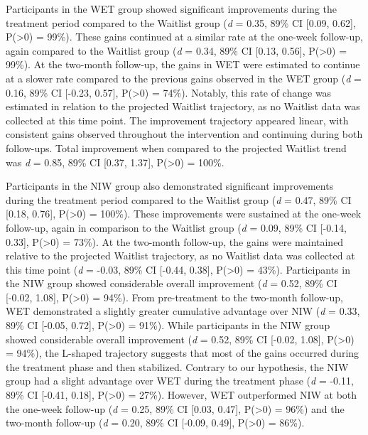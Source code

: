 \documentclass[
  man,floatsintext]{apa7}
\begin{document}
Participants in the WET group showed significant improvements during the treatment period compared to the Waitlist group (\emph{d} = 0.35, 89\% CI {[}0.09, 0.62{]}, P(\textgreater0) = 99\%).
These gains continued at a similar rate at the one-week follow-up, again compared to the Waitlist group (\emph{d} = 0.34, 89\% CI {[}0.13, 0.56{]}, P(\textgreater0) = 99\%).
At the two-month follow-up, the gains in WET were estimated to continue at a slower rate compared to the previous gains observed in the WET group (\emph{d} = 0.16, 89\% CI {[}-0.23, 0.57{]}, P(\textgreater0) = 74\%).
Notably, this rate of change was estimated in relation to the projected Waitlist trajectory, as no Waitlist data was collected at this time point.
The improvement trajectory appeared linear, with consistent gains observed throughout the intervention and continuing during both follow-ups.
Total improvement when compared to the projected Waitlist trend was \emph{d} = 0.85, 89\% CI {[}0.37, 1.37{]}, P(\textgreater0) = 100\%.

Participants in the NIW group also demonstrated significant improvements during the treatment period compared to the Waitlist group (\emph{d} = 0.47, 89\% CI {[}0.18, 0.76{]}, P(\textgreater0) = 100\%).
These improvements were sustained at the one-week follow-up, again in comparison to the Waitlist group (\emph{d} = 0.09, 89\% CI {[}-0.14, 0.33{]}, P(\textgreater0) = 73\%).
At the two-month follow-up, the gains were maintained relative to the projected Waitlist trajectory, as no Waitlist data was collected at this time point (\emph{d} = -0.03, 89\% CI {[}-0.44, 0.38{]}, P(\textgreater0) = 43\%).
Participants in the NIW group showed considerable overall improvement (\emph{d} = 0.52, 89\% CI {[}-0.02, 1.08{]}, P(\textgreater0) = 94\%).
From pre-treatment to the two-month follow-up, WET demonstrated a slightly greater cumulative advantage over NIW (\emph{d} = 0.33, 89\% CI {[}-0.05, 0.72{]}, P(\textgreater0) = 91\%).
While participants in the NIW group showed considerable overall improvement (\emph{d} = 0.52, 89\% CI {[}-0.02, 1.08{]}, P(\textgreater0) = 94\%), the L-shaped trajectory suggests that most of the gains occurred during the treatment phase and then stabilized.
Contrary to our hypothesis, the NIW group had a slight advantage over WET during the treatment phase (\emph{d} = -0.11, 89\% CI {[}-0.41, 0.18{]}, P(\textgreater0) = 27\%).
However, WET outperformed NIW at both the one-week follow-up (\emph{d} = 0.25, 89\% CI {[}0.03, 0.47{]}, P(\textgreater0) = 96\%) and the two-month follow-up (\emph{d} = 0.20, 89\% CI {[}-0.09, 0.49{]}, P(\textgreater0) = 86\%).
\end{document}
